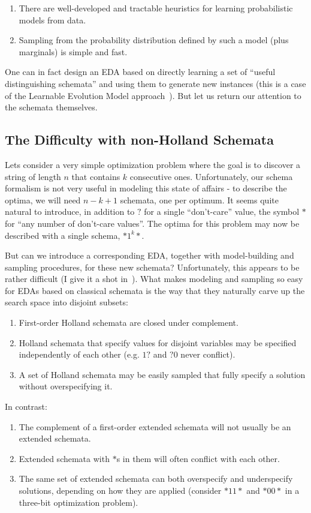 \documentclass[letterpaper]{article}
\begin{document}
\begin{enumerate}
\item There are well-developed and tractable heuristics for learning
  probabilistic models from data.
\item Sampling from the probability distribution defined by such a model (plus
  marginals) is simple and fast.
\end{enumerate}

One can in fact design an EDA based on directly learning a set of ``useful
distinguishing schemata'' and using them to generate new instances (this is a
case of the Learnable Evolution Model approach~\cite{LEM}). But let us return
our attention to the schemata themselves.

\subsection{The Difficulty with non-Holland Schemata}

Lets consider a very simple optimization problem where the goal is to discover
a string of length $n$ that contains $k$ consecutive ones. Unfortunately, our
schema formalism is not very useful in modeling this state of affairs - to
describe the optima, we will need $n-k+1$ schemata, one per optimum. It seems
quite natural to introduce, in addition to $?$ for a single ``don't-care''
value, the symbol $*$ for ``any number of don't-care values''. The optima for
this problem may now be described with a single schema, $*1^k*$.

But can we introduce a corresponding EDA, together with model-building and
sampling procedures, for these new schemata? Unfortunately, this appears to be
rather difficult (I give it a shot in~\cite{fbBOA}). What makes modeling and
sampling so easy for EDAs based on classical schemata is the way that they
naturally carve up the search space into disjoint subsets:
\begin{enumerate}
\item First-order Holland schemata are closed under complement.
\item Holland schemata that specify values for disjoint variables may be
  specified independently of each other (e.g. $1?$ and $?0$ never conflict).
\item A set of Holland schemata may be easily sampled that fully specify a
  solution without overspecifying it.
\end{enumerate}
In contrast:
\begin{enumerate}
\item The complement of a first-order extended schemata will not usually be an
  extended schemata.
\item Extended schemata with $*$s in them will often conflict with each other.
\item The same set of extended schemata can both overspecify and underspecify
  solutions, depending on how they are applied (consider $*11*$ and $*00*$ in a
  three-bit optimization problem).
\end{enumerate}
\end{document}
